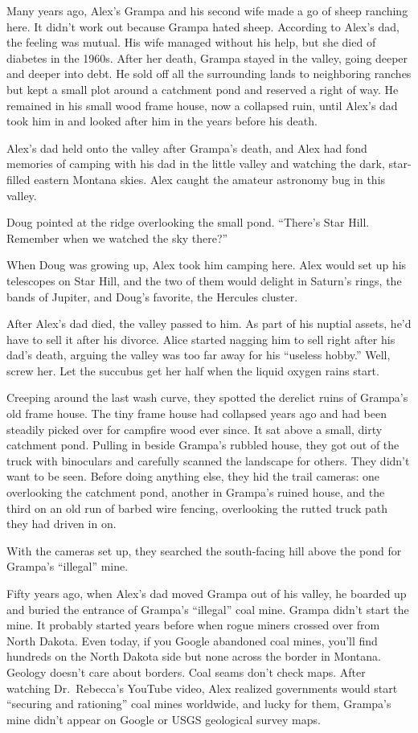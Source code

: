 Many years ago, Alex's Grampa and his second wife made a go of sheep
ranching here. It didn't work out because Grampa hated sheep. According
to Alex's dad, the feeling was mutual. His wife managed without his
help, but she died of diabetes in the 1960s. After her death, Grampa
stayed in the valley, going deeper and deeper into debt. He sold off all
the surrounding lands to neighboring ranches but kept a small plot
around a catchment pond and reserved a right of way. He remained in his
small wood frame house, now a collapsed ruin, until Alex's dad took him
in and looked after him in the years before his death.

Alex's dad held onto the valley after Grampa's death, and Alex had fond
memories of camping with his dad in the little valley and watching the
dark, star-filled eastern Montana skies. Alex caught the amateur
astronomy bug in this valley.

Doug pointed at the ridge overlooking the small pond. ``There's Star
Hill. Remember when we watched the sky there?''

When Doug was growing up, Alex took him camping here. Alex would set up
his telescopes on Star Hill, and the two of them would delight in
Saturn's rings, the bands of Jupiter, and Doug's favorite, the Hercules
cluster.

After Alex's dad died, the valley passed to him. As part of his nuptial
assets, he'd have to sell it after his divorce. Alice started nagging
him to sell right after his dad's death, arguing the valley was too far
away for his ``useless hobby.'' Well, screw her. Let the succubus get
her half when the liquid oxygen rains start.

Creeping around the last wash curve, they spotted the derelict ruins of
Grampa's old frame house. The tiny frame house had collapsed years ago
and had been steadily picked over for campfire wood ever since. It sat
above a small, dirty catchment pond. Pulling in beside Grampa's rubbled
house, they got out of the truck with binoculars and carefully scanned
the landscape for others. They didn't want to be seen. Before doing
anything else, they hid the trail cameras: one overlooking the catchment
pond, another in Grampa's ruined house, and the third on an old run of
barbed wire fencing, overlooking the rutted truck path they had driven
in on.

With the cameras set up, they searched the south-facing hill above the
pond for Grampa's ``illegal'' mine.

Fifty years ago, when Alex's dad moved Grampa out of his valley, he
boarded up and buried the entrance of Grampa's ``illegal'' coal mine.
Grampa didn't start the mine. It probably started years before when
rogue miners crossed over from North Dakota. Even today, if you Google
abandoned coal mines, you'll find hundreds on the North Dakota side but
none across the border in Montana. Geology doesn't care about borders.
Coal seams don't check maps. After watching Dr.~Rebecca's YouTube video,
Alex realized governments would start ``securing and rationing'' coal
mines worldwide, and lucky for them, Grampa's mine didn't appear on
Google or USGS geological survey maps.


